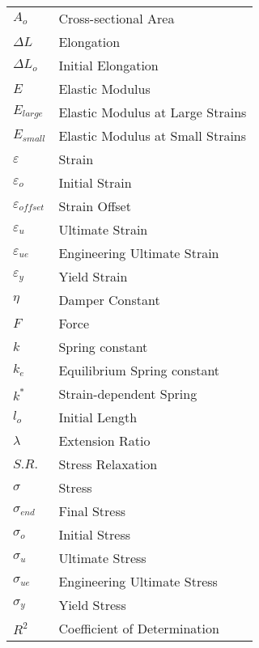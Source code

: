 \begin{Common_Symbols}


\begin{table}[h]
\centering

\begin{tabular}{ll}

$A_o$   & Cross-sectional Area \\
$\Delta L$ & Elongation \\
$\Delta L_o$ & Initial Elongation \\
$E$     & Elastic Modulus \\
$E_{large}$     & Elastic Modulus at Large Strains\\
$E_{small}$     & Elastic Modulus at Small Strains\\
$\varepsilon$   & Strain \\
$\varepsilon_o$   & Initial Strain \\
$\varepsilon_{offset}$ & Strain Offset \\
$\varepsilon_{u}$   & Ultimate Strain \\
$\varepsilon_{ue}$   & Engineering Ultimate Strain \\
$\varepsilon_{y}$   & Yield Strain \\
$\eta$     & Damper Constant \\
$F$     & Force \\
$k$     & Spring constant \\
$k_e$     & Equilibrium Spring constant \\
$k^*$     & Strain-dependent Spring \\
$l_o$   & Initial Length \\
$\lambda$   & Extension Ratio \\
$S.R.$      & Stress Relaxation\\
$\sigma$   & Stress \\
$\sigma_{end}$   & Final Stress \\
$\sigma_o$   & Initial Stress \\
$\sigma_{u}$   & Ultimate Stress \\
$\sigma_{ue}$   & Engineering Ultimate Stress \\
$\sigma_{y}$   & Yield Stress \\
$R^2$      & Coefficient of Determination\\


\end{tabular}


\end{table}
\end{Common_Symbols}
